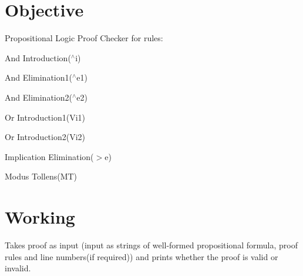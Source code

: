\hypertarget{index_Objective}{}\section{Objective}\label{index_Objective}
Propositional Logic Proof Checker for rules\+:

And Introduction($^\wedge$i)

And Elimination1($^\wedge$e1)

And Elimination2($^\wedge$e2)

Or Introduction1(\+Vi1)

Or Introduction2(\+Vi2)

Implication Elimination($>$e)

Modus Tollens(\+M\+T)\hypertarget{index_Working}{}\section{Working}\label{index_Working}
Takes proof as input (input as strings of well-\/formed propositional formula, proof rules and line numbers(if required)) and prints whether the proof is valid or invalid. 